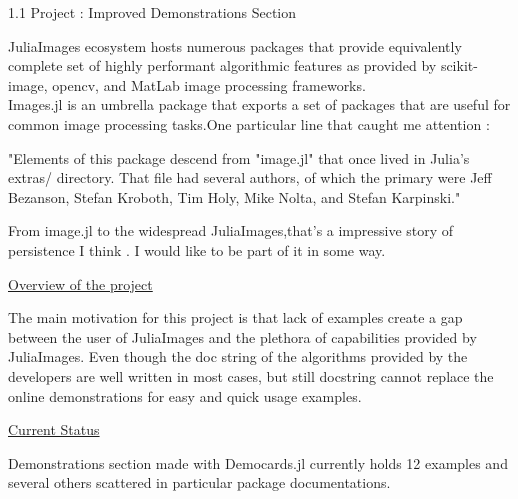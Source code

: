\Large
{}{1.1 Project : Improved Demonstrations Section}

\vspace{0.5cm}
\large
JuliaImages ecosystem hosts numerous packages that provide equivalently\\ complete set of highly performant algorithmic features as provided by scikit-image, opencv, and MatLab image processing frameworks.  \\

Images.jl is an umbrella package that exports a set of packages that are useful for common image processing tasks.One particular line that caught me attention :
\begin{displayquote}
"Elements of this package descend from "image.jl" that once lived in Julia's extras/ directory. That file had several authors, of which the primary were Jeff Bezanson, Stefan Kroboth, Tim Holy, Mike Nolta, and Stefan Karpinski."

\end{displayquote}

From image.jl to the widespread JuliaImages,that's a impressive story of persistence I think . I would like to be part of it in some way.

\vspace{0.5cm}
\Large
\underline{Overview of the project}

\vspace{0.3cm}
\large
The main motivation for this project is that lack of examples create a gap between the user of JuliaImages and the plethora of capabilities provided by JuliaImages. Even though the doc string of the algorithms provided by the developers are well written in most cases, but still docstring cannot replace the online demonstrations for easy and quick usage examples.

\vspace{0.5cm}
\Large
\underline{Current Status}

\vspace{0.3cm}
\large
Demonstrations section made with Democards.jl currently holds 12 examples and several others scattered in particular package documentations.

